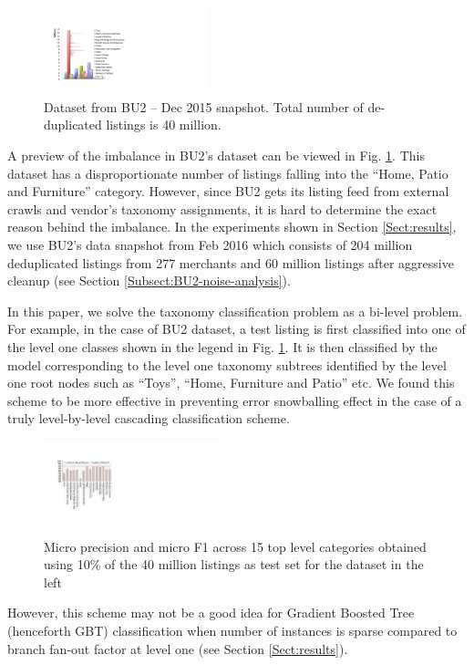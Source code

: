 \begin{figure}
	\centering
	\vspace{-0.6cm}
	\includegraphics[width=0.42\textwidth]{images/BU2-dataset-Dec2015}
	\vspace{-0.6cm}
	\caption{{\small Dataset from BU2 -- Dec 2015 snapshot. Total number of de-duplicated listings is 40 million.}}
	\vspace{-0.6cm}
	\label{Figure_BU2-datset-earlier}
\end{figure}
A preview of the imbalance in BU2's dataset can be viewed in Fig. \ref{Figure_BU2-datset-earlier}.  
This dataset has a disproportionate number of listings falling into the ``Home, Patio and Furniture'' category.
However, since BU2 gets its listing feed from external crawls and vendor's taxonomy assignments, it is hard to determine the exact reason behind the imbalance. 
In the experiments shown in Section \ref{Sect:results}, we use BU2's data snapshot from Feb 2016 which consists of 204 million deduplicated listings from 277 merchants and 60 million listings after aggressive cleanup (see Section \ref{Subsect:BU2-noise-analysis}).

In this paper, we solve the taxonomy classification problem as a bi-level problem.
For example, in the case of BU2 dataset, a test listing is first classified into one of the level one classes shown in the legend in Fig. \ref{Figure_BU2-datset-earlier}.
It is then classified by the model corresponding to the level one taxonomy subtrees identified by the level one root nodes such as ``Toys'', ``Home, Furniture and Patio'' etc.
We found this scheme to be more effective in preventing error snowballing effect in the case of a truly level-by-level cascading classification scheme.
\begin{figure}
	\centering
	\vspace{-0.6cm}
	\includegraphics[width=0.45\textwidth]{images/BU2-Dec2015-LogRegL1}
	\vspace{-0.6cm}
	\caption{{\small Micro precision and micro F1 across 15 top level categories obtained using 10\% of the 40 million listings as test set for the dataset in the left }}
	\label{Figure_BU2-WUC-LogRegL1}
	\vspace{-0.4cm}
\end{figure}
However, this scheme may not be a good idea for Gradient Boosted Tree (henceforth GBT) \cite{Friedman:GBT} classification when number of instances is sparse compared to branch fan-out factor at level one (see Section \ref{Sect:results}).


